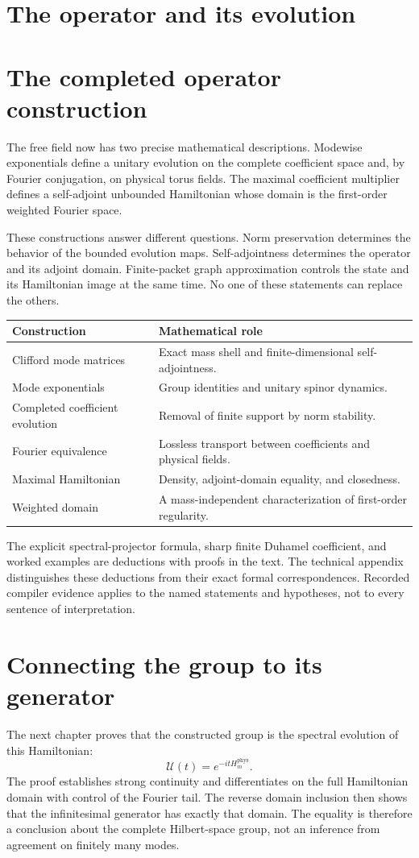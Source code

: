 \clearpage
\section*{The operator and its evolution}
\section{The completed operator construction}
The free field now has two precise mathematical descriptions. Modewise exponentials define a unitary evolution on the complete coefficient space and, by Fourier conjugation, on physical torus fields. The maximal coefficient multiplier defines a self-adjoint unbounded Hamiltonian whose domain is the first-order weighted Fourier space.

These constructions answer different questions. Norm preservation determines the behavior of the bounded evolution maps. Self-adjointness determines the operator and its adjoint domain. Finite-packet graph approximation controls the state and its Hamiltonian image at the same time. No one of these statements can replace the others.

\begin{longtable}{@{}L{.36\linewidth}L{.55\linewidth}@{}}
\toprule
Construction & Mathematical role\\\midrule\endhead
Clifford mode matrices & Exact mass shell and finite-dimensional self-adjointness.\\
Mode exponentials & Group identities and unitary spinor dynamics.\\
Completed coefficient evolution & Removal of finite support by norm stability.\\
Fourier equivalence & Lossless transport between coefficients and physical fields.\\
Maximal Hamiltonian & Density, adjoint-domain equality, and closedness.\\
Weighted domain & A mass-independent characterization of first-order regularity.\\
\bottomrule
\end{longtable}

The explicit spectral-projector formula, sharp finite Duhamel coefficient, and worked examples are deductions with proofs in the text. The technical appendix distinguishes these deductions from their exact formal correspondences. Recorded compiler evidence applies to the named statements and hypotheses, not to every sentence of interpretation.

\section{Connecting the group to its generator}
The next chapter proves that the constructed group is the spectral evolution of this Hamiltonian:
\[
\mathcal U(t)=e^{-itH_m^{\mathrm{phys}}}.
\]
The proof establishes strong continuity and differentiates on the full Hamiltonian domain with control of the Fourier tail. The reverse domain inclusion then shows that the infinitesimal generator has exactly that domain. The equality is therefore a conclusion about the complete Hilbert-space group, not an inference from agreement on finitely many modes.

